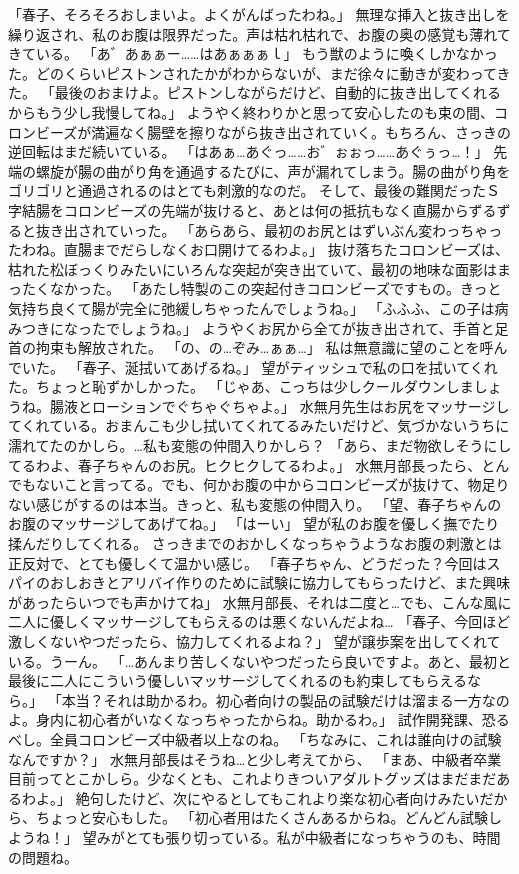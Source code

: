 「春子、そろそろおしまいよ。よくがんばったわね。」
無理な挿入と抜き出しを繰り返され、私のお腹は限界だった。声は枯れ枯れで、お腹の奥の感覚も薄れてきている。
「あ゛あぁぁー……はあぁぁぁｌ」
もう獣のように喚くしかなかった。どのくらいピストンされたかがわからないが、まだ徐々に動きが変わってきた。
「最後のおまけよ。ピストンしながらだけど、自動的に抜き出してくれるからもう少し我慢してね。」
ようやく終わりかと思って安心したのも束の間、コロンビーズが満遍なく腸壁を擦りながら抜き出されていく。もちろん、さっきの逆回転はまだ続いている。
「はあぁ…あぐっ……お゛ぉぉっ……あぐぅっ…！」
先端の螺旋が腸の曲がり角を通過するたびに、声が漏れてしまう。腸の曲がり角をゴリゴリと通過されるのはとても刺激的なのだ。
そして、最後の難関だったＳ字結腸をコロンビーズの先端が抜けると、あとは何の抵抗もなく直腸からずるずると抜き出されていった。
「あらあら、最初のお尻とはずいぶん変わっちゃったわね。直腸までだらしなくお口開けてるわよ。」
抜け落ちたコロンビーズは、枯れた松ぼっくりみたいにいろんな突起が突き出ていて、最初の地味な面影はまったくなかった。
「あたし特製のこの突起付きコロンビーズですもの。きっと気持ち良くて腸が完全に弛緩しちゃったんでしょうね。」
「ふふふ、この子は病みつきになったでしょうね。」
ようやくお尻から全てが抜き出されて、手首と足首の拘束も解放された。
「の、の…ぞみ…ぁぁ…」
私は無意識に望のことを呼んでいた。
「春子、涎拭いてあげるね。」
望がティッシュで私の口を拭いてくれた。ちょっと恥ずかしかった。
「じゃあ、こっちは少しクールダウンしましょうね。腸液とローションでぐちゃぐちゃよ。」
水無月先生はお尻をマッサージしてくれている。おまんこも少し拭いてくれてるみたいだけど、気づかないうちに濡れてたのかしら。…私も変態の仲間入りかしら？
「あら、まだ物欲しそうにしてるわよ、春子ちゃんのお尻。ヒクヒクしてるわよ。」
水無月部長ったら、とんでもないこと言ってる。でも、何かお腹の中からコロンビーズが抜けて、物足りない感じがするのは本当。きっと、私も変態の仲間入り。
「望、春子ちゃんのお腹のマッサージしてあげてね。」
「はーい」
望が私のお腹を優しく撫でたり揉んだりしてくれる。
さっきまでのおかしくなっちゃうようなお腹の刺激とは正反対で、とても優しくて温かい感じ。
「春子ちゃん、どうだった？今回はスパイのおしおきとアリバイ作りのために試験に協力してもらったけど、また興味があったらいつでも声かけてね」
水無月部長、それは二度と…でも、こんな風に二人に優しくマッサージしてもらえるのは悪くないんだよね…
「春子、今回ほど激しくないやつだったら、協力してくれるよね？」
望が譲歩案を出してくれている。うーん。
「…あんまり苦しくないやつだったら良いですよ。あと、最初と最後に二人にこういう優しいマッサージしてくれるのも約束してもらえるなら。」
「本当？それは助かるわ。初心者向けの製品の試験だけは溜まる一方なのよ。身内に初心者がいなくなっちゃったからね。助かるわ。」
試作開発課、恐るべし。全員コロンビーズ中級者以上なのね。
「ちなみに、これは誰向けの試験なんですか？」
水無月部長はそうね…と少し考えてから、
「まあ、中級者卒業目前ってとこかしら。少なくとも、これよりきついアダルトグッズはまだまだあるわよ。」
絶句したけど、次にやるとしてもこれより楽な初心者向けみたいだから、ちょっと安心もした。
「初心者用はたくさんあるからね。どんどん試験しようね！」
望みがとても張り切っている。私が中級者になっちゃうのも、時間の問題ね。



